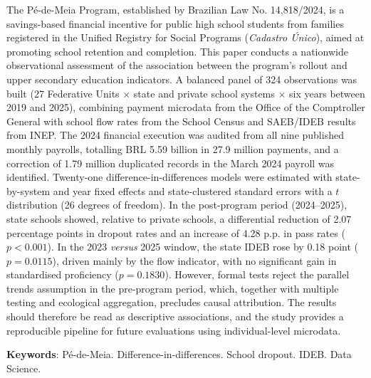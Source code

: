 
\begin{resumo}[Abstract]

    The Pé-de-Meia Program, established by Brazilian Law No. 14,818/2024, is a savings-based financial incentive for public high school students from families registered in the Unified Registry for Social Programs (\textit{Cadastro Único}), aimed at promoting school retention and completion.
    This paper conducts a nationwide observational assessment of the association between the program's rollout and upper secondary education indicators.
    A balanced panel of 324 observations was built (27 Federative Units $\times$ state and private school systems $\times$ six years between 2019 and 2025), combining payment microdata from the Office of the Comptroller General with school flow rates from the School Census and SAEB/IDEB results from INEP.
    The 2024 financial execution was audited from all nine published monthly payrolls, totalling BRL 5.59 billion in 27.9 million payments, and a correction of 1.79 million duplicated records in the March 2024 payroll was identified.
    Twenty-one difference-in-differences models were estimated with state-by-system and year fixed effects and state-clustered standard errors with a $t$ distribution (26 degrees of freedom).
    In the post-program period (2024--2025), state schools showed, relative to private schools, a differential reduction of 2.07 percentage points in dropout rates and an increase of 4.28 p.p. in pass rates ($p < 0.001$).
    In the 2023 \textit{versus} 2025 window, the state IDEB rose by 0.18 point ($p = 0.0115$), driven mainly by the flow indicator, with no significant gain in standardised proficiency ($p = 0.1830$).
    However, formal tests reject the parallel trends assumption in the pre-program period, which, together with multiple testing and ecological aggregation, precludes causal attribution.
    The results should therefore be read as descriptive associations, and the study provides a reproducible pipeline for future evaluations using individual-level microdata.

    \par\vspace{\baselineskip}

    \noindent\textbf{Keywords}: Pé-de-Meia. Difference-in-differences. School dropout. IDEB. Data Science.
\end{resumo}

